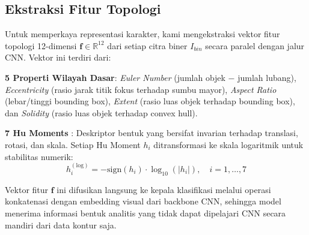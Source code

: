 \documentclass[journal]{IEEEtran}
\begin{document}
\subsection{Ekstraksi Fitur Topologi}
Untuk memperkaya representasi karakter, kami mengekstraksi vektor fitur topologi 12-dimensi $\mathbf{f} \in \mathbb{R}^{12}$ dari setiap citra biner $I_{bin}$ secara paralel dengan jalur CNN. Vektor ini terdiri dari:

\textbf{5 Properti Wilayah Dasar}: \textit{Euler Number} (jumlah objek $-$ jumlah lubang), \textit{Eccentricity} (rasio jarak titik fokus terhadap sumbu mayor), \textit{Aspect Ratio} (lebar/tinggi bounding box), \textit{Extent} (rasio luas objek terhadap bounding box), dan \textit{Solidity} (rasio luas objek terhadap convex hull).

\textbf{7 Hu Moments} \cite{hu1962visual}: Deskriptor bentuk yang bersifat invarian terhadap translasi, rotasi, dan skala. Setiap Hu Moment $h_i$ ditransformasi ke skala logaritmik untuk stabilitas numerik:
\begin{equation}
h_i^{(\text{log})} = -\text{sign}(h_i) \cdot \log_{10}(|h_i|), \quad i = 1, \ldots, 7
\end{equation}

Vektor fitur $\mathbf{f}$ ini difusikan langsung ke kepala klasifikasi melalui operasi konkatenasi dengan embedding visual dari backbone CNN, sehingga model menerima informasi bentuk analitis yang tidak dapat dipelajari CNN secara mandiri dari data kontur saja.
\end{document}

